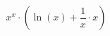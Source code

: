 \documentclass[a4paper,12pt]{article}
\begin{document}
$$x ^{x}  \cdot ( \ln (x)  +  \frac{1}{x}  \cdot x)$$
\end{document}
